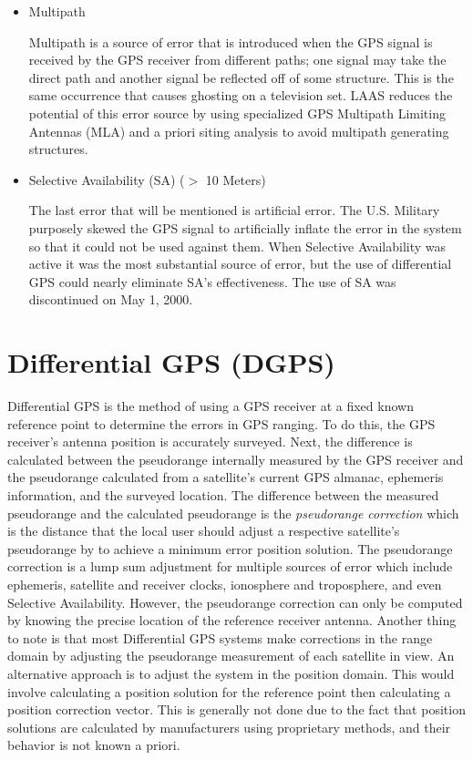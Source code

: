 \begin{itemize}
	\item Multipath

Multipath is a source of error that is introduced when the GPS signal is received by the GPS receiver from different paths; one signal may take the direct path and another signal be reflected off of some structure. This is the same occurrence that causes ghosting on a television set. LAAS reduces the potential of this error source by using specialized GPS Multipath Limiting Antennas (MLA) and a priori siting analysis to avoid multipath generating structures.

	\item Selective Availability (SA) ($>$ 10 Meters)

The last error that will be mentioned is artificial error.  The U.S. Military purposely skewed the GPS signal to artificially inflate the error in the system so that it could not be used against them.  When Selective Availability was active it was the most substantial source of error, but the use of differential GPS could nearly eliminate SA's effectiveness. The use of SA was discontinued on May 1, 2000.

\end{itemize}

\section{Differential GPS (DGPS)\label{section:DGPS}}

Differential GPS is the method of using a GPS receiver at a fixed known reference point to determine the errors in GPS ranging. To do this, the GPS receiver's antenna position is accurately surveyed.  Next, the difference is calculated between the pseudorange internally measured by the GPS receiver and the pseudorange calculated from a satellite's current GPS almanac, ephemeris information, and the surveyed location.  The difference between the measured pseudorange and the calculated pseudorange is the \textit{pseudorange correction} which is the distance that the local user should adjust a respective satellite's pseudorange by to achieve a minimum error position solution. The pseudorange correction is a lump sum adjustment for multiple sources of error which include ephemeris, satellite and receiver clocks, ionosphere and troposphere, and even Selective Availability. However, the pseudorange correction can only be computed by knowing the precise location of the reference receiver antenna. Another thing to note is that most Differential GPS systems make corrections in the range domain by adjusting the pseudorange measurement of each satellite in view.  An alternative approach is to adjust the system in the position domain.  This would involve calculating a position solution for the reference point then calculating a position correction vector.  This is generally not done due to the fact that position solutions are calculated by manufacturers using proprietary methods, and their behavior is not known a priori.

